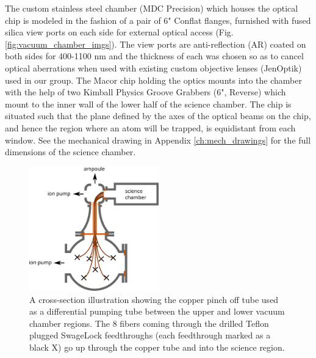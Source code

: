 The custom stainless steel chamber (MDC Precision) which houses the optical chip is modeled in the fashion of a pair of 6" Conflat flanges, furnished with fused silica view ports on each side for external optical access (Fig. \ref{fig:vacuum_chamber_imgs}). The view ports are anti-reflection (AR) coated on both sides for 400-1100 nm and the thickness of each was chosen so as to cancel optical aberrations when used with existing custom objective lenses (JenOptik) used in our group. The Macor chip holding the optics mounts into the chamber with the help of two Kimball Physics Groove Grabbers (6", Reverse) which mount to the inner wall of the lower half of the science chamber. The chip is situated such that the plane defined by the axes of the optical beams on the chip, and hence the region where an atom will be trapped, is equidistant from each window. See the mechanical drawing in Appendix \ref{ch:mech_drawings} for the full dimensions of the science chamber.

\begin{figure}
    \centering
    \includegraphics[width=0.5\textwidth]{Images/differential_pumping.pdf}
    \caption{A cross-section illustration showing the copper pinch off tube used as a differential pumping tube between the upper and lower vacuum chamber regions. The 8 fibers coming through the drilled Teflon plugged SwageLock feedthroughs (each feedthrough marked as a black X) go up through the copper tube and into the science region.}
    \label{fig:differential_pumping}
\end{figure}

